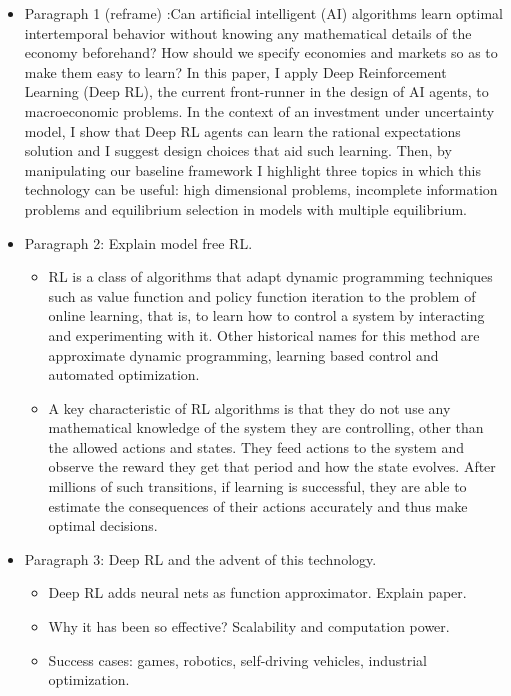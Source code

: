 \documentclass[11pt,english]{article}
\begin{document}
\begin{itemize}
	\item Paragraph 1 (reframe) :Can artificial intelligent (AI) algorithms learn optimal intertemporal behavior without knowing any mathematical details of the economy beforehand?  How should we specify economies and markets so as to make them easy to learn? In this paper, I apply Deep Reinforcement Learning (Deep RL), the current front-runner in the design of AI agents, to macroeconomic problems. In the context of an investment under uncertainty model, I show that Deep RL agents can learn the rational expectations solution and I suggest design choices that aid such learning. Then, by manipulating our baseline framework I highlight three topics in which this technology can be useful: high dimensional problems, incomplete information problems and equilibrium selection in models with multiple equilibrium.\medskip
	
	\item Paragraph 2: Explain model free RL. \medskip 
	
	\begin{itemize}
		\item RL is a class of algorithms that adapt dynamic programming techniques such as value function and policy function iteration to the problem of online learning, that is, to learn how to control a system by interacting and experimenting with it. Other historical names for this method are approximate dynamic programming, learning based control and automated optimization.  \medskip
		\item A key characteristic of RL algorithms is that they do not use any mathematical knowledge of  the system they are controlling, other than the allowed actions and states. They feed actions to the system and observe the reward they get that period and how the state evolves. After millions of such transitions, if learning is successful, they are able to estimate the consequences of their actions accurately and thus make optimal decisions. \medskip
	\end{itemize}

	\item Paragraph 3: Deep RL and the advent of this technology. \medskip 
	
			\begin{itemize}
			\item Deep RL adds neural nets as function approximator. Explain paper. \medskip
			\item Why it has been so effective? Scalability and computation power. \medskip
			\item Success cases: games, robotics, self-driving vehicles, industrial optimization. 
		\end{itemize}


\end{itemize}
\end{document}
